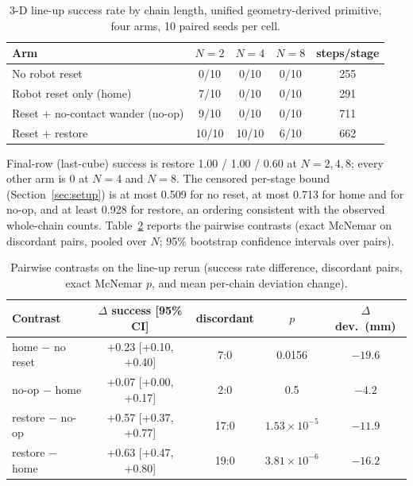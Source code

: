 \documentclass[11pt]{article}
\begin{document}
\begin{table}[h]
\centering
\caption{3-D line-up success rate by chain length, unified geometry-derived
primitive, four arms, 10 paired seeds per cell.}
\label{tab:lineup}
\begin{tabular}{lcccc}
\toprule
Arm & $N=2$ & $N=4$ & $N=8$ & steps/stage \\
\midrule
No robot reset          & 0/10  & 0/10  & 0/10 & 255 \\
Robot reset only (home) & 7/10  & 0/10  & 0/10 & 291 \\
Reset + no-contact wander (no-op) & 9/10 & 0/10 & 0/10 & 711 \\
Reset + restore          & 10/10 & 10/10 & 6/10 & 662 \\
\bottomrule
\end{tabular}
\end{table}

Final-row (last-cube) success is restore 1.00 / 1.00 / 0.60 at $N=2,4,8$;
every other arm is 0 at $N=4$ and $N=8$. The censored per-stage bound
(Section~\ref{sec:setup}) is at most 0.509 for no reset, at most 0.713 for
home and for no-op, and at least 0.928 for restore, an ordering consistent
with the observed whole-chain counts. Table~\ref{tab:lineup-contrasts}
reports the pairwise contrasts (exact McNemar on discordant pairs, pooled
over $N$; 95\% bootstrap confidence intervals over pairs).

\begin{table}[h]
\centering
\caption{Pairwise contrasts on the line-up rerun (success rate difference,
discordant pairs, exact McNemar $p$, and mean per-chain deviation change).}
\label{tab:lineup-contrasts}
\begin{tabular}{lcccc}
\toprule
Contrast & $\Delta$ success [95\% CI] & discordant & $p$ & $\Delta$ dev.\ (mm) \\
\midrule
home $-$ no reset    & +0.23 [+0.10, +0.40] & 7:0  & 0.0156   & $-19.6$ \\
no-op $-$ home       & +0.07 [+0.00, +0.17] & 2:0  & 0.5      & $-4.2$ \\
restore $-$ no-op    & +0.57 [+0.37, +0.77] & 17:0 & $1.53\times10^{-5}$ & $-11.9$ \\
restore $-$ home     & +0.63 [+0.47, +0.80] & 19:0 & $3.81\times10^{-6}$ & $-16.2$ \\
\bottomrule
\end{tabular}
\end{table}
\end{document}
